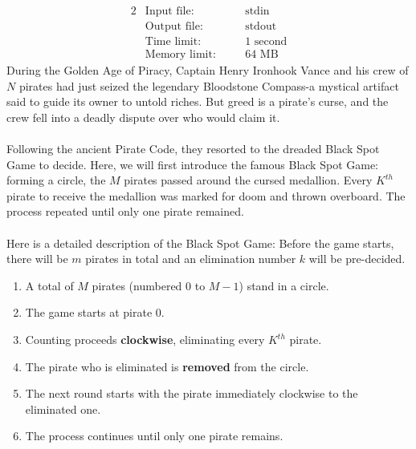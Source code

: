 \documentclass[12pt,a4paper]{article}
\begin{document}
\begin{alignat*} {2}
 &   \text{Input file:}   \quad     &&\text{stdin}\\
 &   \text{Output file:}  \quad     &&\text{stdout}\\
 &   \text{Time limit:}   \quad     &&\text{1 second}\\
 &   \text{Memory limit:} \quad     &&\text{64 MB}
\end{alignat*}
\noindent
During the Golden Age of Piracy, Captain Henry Ironhook Vance and his crew of \(N\) pirates had just seized the legendary Bloodstone Compass-a mystical artifact said to guide its owner to untold riches. 
But greed is a pirate's curse, and the crew fell into a deadly dispute over who would claim it.\\
\noindent\\
Following the ancient Pirate Code, they resorted to the dreaded Black Spot Game to decide. 
Here, we will first introduce the famous Black Spot Game: forming a circle, the \(M\) pirates passed around the cursed medallion. 
Every \(K^{th}\) pirate to receive the medallion was marked for doom and thrown overboard. 
The process repeated until only one pirate remained.\\
\noindent\\
Here is a detailed description of the Black Spot Game:
Before the game starts, there will be \(m\) pirates in total and an elimination number \(k\) will be pre-decided.
\begin{enumerate}
    \setlength{\itemsep}{-3pt} %
    \item A total of \(M\) pirates (numbered 0 to \(M-1\)) stand in a circle.
    \item The game starts at pirate 0.
    \item Counting proceeds \textbf{clockwise}, eliminating every \(K^{th}\) pirate.
    \item The pirate who is eliminated is \textbf{removed} from the circle.
    \item The next round starts with the pirate immediately clockwise to the eliminated one.
    \item The process continues until only one pirate remains.
\end{enumerate}
\end{document}
